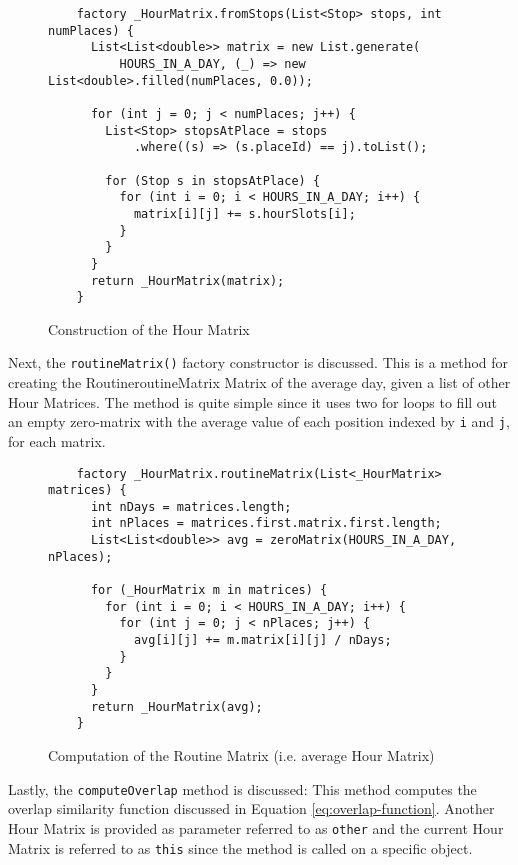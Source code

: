 \begin{figure}
    \centering
    \begin{verbatim}
    factory _HourMatrix.fromStops(List<Stop> stops, int numPlaces) {
      List<List<double>> matrix = new List.generate(
          HOURS_IN_A_DAY, (_) => new List<double>.filled(numPlaces, 0.0));
    
      for (int j = 0; j < numPlaces; j++) {
        List<Stop> stopsAtPlace = stops
            .where((s) => (s.placeId) == j).toList();
    
        for (Stop s in stopsAtPlace) {
          for (int i = 0; i < HOURS_IN_A_DAY; i++) {
            matrix[i][j] += s.hourSlots[i];
          }
        }
      }
      return _HourMatrix(matrix);
    }
    \end{verbatim}
    \caption{Construction of the Hour Matrix}
    \label{fig:hour-matrix-construction}
\end{figure}

Next, the \verb|routineMatrix()| factory constructor is discussed. This is a method for creating the RoutineroutineMatrix Matrix of the average day, given a list of other Hour Matrices. The method is quite simple since it uses two for loops to fill out an empty zero-matrix with the average value of each position indexed by \verb|i| and \verb|j|, for each matrix.

\begin{figure}
    \centering
    \begin{verbatim}
    factory _HourMatrix.routineMatrix(List<_HourMatrix> matrices) {
      int nDays = matrices.length;
      int nPlaces = matrices.first.matrix.first.length;
      List<List<double>> avg = zeroMatrix(HOURS_IN_A_DAY, nPlaces);
    
      for (_HourMatrix m in matrices) {
        for (int i = 0; i < HOURS_IN_A_DAY; i++) {
          for (int j = 0; j < nPlaces; j++) {
            avg[i][j] += m.matrix[i][j] / nDays;
          }
        }
      }
      return _HourMatrix(avg);
    }
    \end{verbatim}
    \caption{Computation of the Routine Matrix (i.e. average Hour Matrix)}
    \label{fig:hour-matrix-average}
\end{figure}

Lastly, the \verb|computeOverlap| method is discussed: This method computes the overlap similarity function discussed in Equation \eqref{eq:overlap-function}. Another Hour Matrix is provided as parameter referred to as \verb|other| and the current Hour Matrix is referred to as \verb|this| since the method is called on a specific object. 

